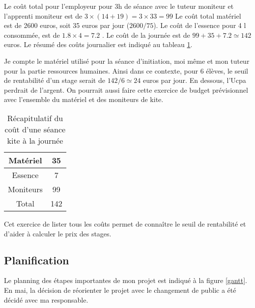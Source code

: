 \documentclass[11pt,a4paper]{report}
\begin{document}
Le coût total pour l'employeur pour 3h de séance avec le tuteur moniteur
et l'apprenti moniteur est de $3\times(14+19) = 3\times33 = 99 $
Le coût total matériel est de 2600 euros, soit 35 euros par jour ($2600/75$).
Le coût de l'essence pour 4 l consommée, est de $1.8\times4 = 7.2$ .
Le coût de la journée est de $99 + 35 + 7.2 \simeq  142 $ euros.
Le résumé des coûts journalier est indiqué au tableau \ref{cout_journalier}.

Je compte le matériel utilisé pour la séance d’initiation,
moi m\^eme et mon tuteur pour la partie ressources humaines.
Ainsi dans ce contexte,  pour 6 élèves, le seuil de rentabilité
d'un stage serait de $142/6 \simeq 24$ euros
par jour. En dessous, l'Ucpa perdrait de l'argent.
On pourrait aussi faire cette exercice de budget prévisionnel avec
l'ensemble du matériel et des moniteurs de kite.

\begin{table}
\begin{centering}
\begin{tabular}{|c|c|}
\hline
Matériel  & 35 \\
\hline
Essence   & 7   \\
\hline
Moniteurs  & 99 \\
\hline
Total     & 142 \\
\hline
\end{tabular}
\caption{Récapitulatif du co\^ut d'une séance kite à la journée\label{cout_journalier}}
\end{centering}
\end{table}

Cet exercice de lister tous les co\^uts permet de connaître le seuil 
de rentabilité et d'aider à calculer le prix des stages.

\subsection{Planification}
Le planning des étapes importantes de mon projet est indiqué
à la figure \ref{gantt}. En mai, la décision de  réorienter 
le projet avec le changement de public a été décidé avec
ma responsable. 
\end{document}
